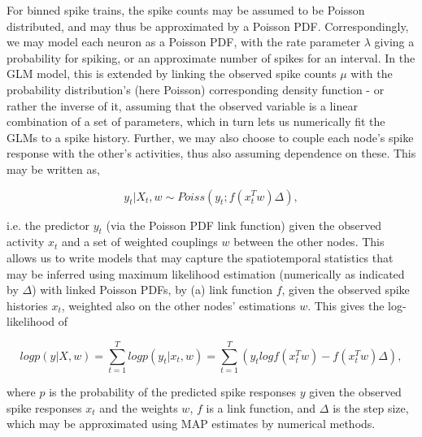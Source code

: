 \documentclass[mphil,deptreport,ianc]{infthesis} %
\begin{document}
For binned spike trains, the spike counts may be assumed to be Poisson distributed, and may thus be approximated by a Poisson PDF.
Correspondingly, we may model each neuron as a Poisson PDF, with the rate parameter $\lambda$ giving a probability for spiking, or an approximate number of spikes for an interval.
In the GLM model, this is extended by linking the observed spike counts $\mu$ with the probability distribution's (here Poisson) corresponding density function - or rather the inverse of it, assuming that the observed variable is a linear combination of a set of parameters, which in turn lets us numerically fit the GLMs to a spike history.
Further, we may also choose to couple each node's spike response with the other's activities, thus also assuming dependence on these. This may be written as,

\begin{equation}
    y_t|X_t, w \sim Poiss(y_t; f(x_t^T w)\Delta),
\end{equation}

i.e. the predictor $y_t$ (via the Poisson PDF link function) given the observed activity $x_t$ and a set of weighted couplings $w$ between the other nodes. This allows us to write models that may capture the spatiotemporal statistics that may be inferred using maximum likelihood estimation (numerically as indicated by $\Delta$) with linked Poisson PDFs, by (a) link function $f$, given the observed spike histories $x_t$, weighted also on the other nodes' estimations $w$.
This gives the log-likelihood of

\begin{equation}
    log p(y|X, w) = \sum_{t=1}^T log p(y_t| x_t, w) = \sum_{t=1}^T(y_t log f(x_t^Tw) - f(x_t^Tw)\Delta),
\end{equation}

where $p$ is the probability of the predicted spike responses $y$ given the observed spike responses $x_t$ and the weights $w$, $f$ is a link function, and $\Delta$ is the step size,
which may be approximated using MAP estimates by numerical methods.


\end{document}
